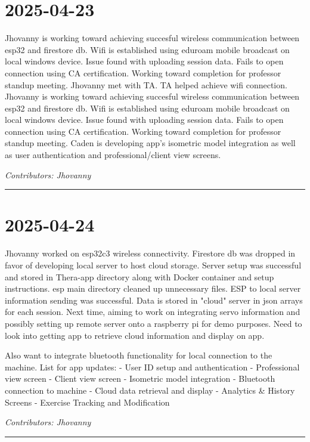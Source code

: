 \documentclass[12pt]{article}
\begin{document}
\section*{2025-04-23}
Jhovanny is working toward achieving succesful wireless communication between esp32 and firestore db. Wifi is established using eduroam mobile broadcast on local windows device. Issue found with uploading session data. Fails to open connection using CA certification. Working toward completion for professor standup meeting.
Jhovanny met with TA. TA helped achieve wifi connection. Jhovanny is working toward achieving succesful wireless communication between esp32 and firestore db. Wifi is established using eduroam mobile broadcast on local windows device. Issue found with uploading session data. Fails to open connection using CA certification. Working toward completion for professor standup meeting.
Caden is developing app's isometric model integration as well as user authentication and professional/client view screens. 

\vspace{1em}
\noindent\textit{Contributors: Jhovanny}
\vspace{1em}
\hrule

\section*{2025-04-24}
Jhovanny worked on esp32c3 wireless connectivity. Firestore db was dropped in favor of developing local server to host cloud storage. Server setup was successful and stored in Thera-app directory along with Docker container and setup instructions. esp main directory cleaned up unnecessary files. ESP to local server information sending was successful. Data is stored in "cloud" server in json arrays for each session.
Next time, aiming to work on integrating servo information and possibly setting up remote server onto a raspberry pi for demo purposes. Need to look into getting app to retrieve cloud information and display on app.

Also want to integrate bluetooth functionality for local connection to the machine. 
List for app updates:
- User ID setup and authentication
- Professional view screen
- Client view screen
- Isometric model integration
- Bluetooth connection to machine
- Cloud data retrieval and display
- Analytics & History Screens
- Exercise Tracking and Modification

\vspace{1em}
\noindent\textit{Contributors: Jhovanny}
\vspace{1em}
\hrule
\end{document}
